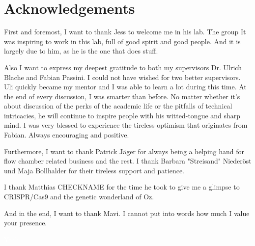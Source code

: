 \section*{Acknowledgements}
First and foremost, I want to thank Jess to welcome me in his lab. The group  It was inspiring to work in this lab, full of good spirit and good people. And it is largely due to him, as he is the one that does stuff. 

Also I want to express my deepest gratitude to both my supervisors Dr. Ulrich Blache and Fabian Passini. I could not have wished for two better supervisors. Uli quickly became my mentor and I was able to learn a lot during this time. At the end of every discussion, I was smarter than before. No matter whether it's about discussion of the perks of the academic life or the pitfalls of technical intricacies, he will continue to inspire people with his witted-tongue and sharp mind. I was very blessed to experience the tireless optimism that originates from Fabian. Always encouraging and positive.

Furthermore, I want to thank Patrick Jäger for always being a helping hand for flow chamber related business and the rest. I thank Barbara "Streisand" Niederöst und Maja Bollhalder for their tireless support and patience. 

I thank Matthias CHECKNAME for the time he took to give me a glimpse to CRISPR/Cas9 and the genetic wonderland of Oz. 

And in the end, I want to thank Mavi. I cannot put into words how much I value your presence. 

\clearpage
\textcolor{white}{Yeah}
\clearpage
